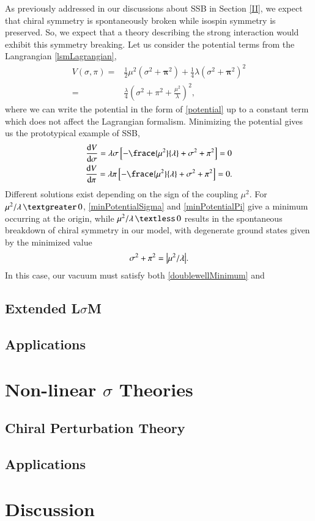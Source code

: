 \documentclass[aps,prd,onecolumn,showpacs,amsmath,amssymb,nofootinbib]{revtex4} \pdfoutput=1
\begin{document}
  As previously addressed in our discussions about SSB in Section \ref{II}, we expect that chiral symmetry is spontaneously broken while isospin symmetry is preserved. So, we expect that a theory describing the strong interaction would exhibit this symmetry breaking. Let us consider the potential terms from the Langrangian \eqref{lsmLagrangian},
  \begin{align}
      V(\sigma,\pi) = &\frac{1}{2}\mu^2\left(\sigma^2+\mathbf{\pi}^2\right) + \frac{1}{4}\lambda\left(\sigma^2+\mathbf{\pi}^2\right)^2\\
      = & \frac{\lambda}{4}\left(\sigma^2+\pi^2 + \frac{\mu^2}{\lambda} \right)^2,\label{potential}
  \end{align}
  where we can write the potential in the form of \eqref{potential} up to a constant term which does not affect the Lagrangian formalism. Minimizing the potential gives us the prototypical example of SSB,
  \begin{gather}
      \frac{\mathrm{d}V}{\mathrm{d}\mathbf{\sigma}} = \lambda \sigma \left[ -\frace{\mu^2}{\lambda} + \sigma^2 + \pi^2  \right]=0 \label{minPotentialSigma}\\
      \frac{\mathrm{d}V}{\mathrm{d}\mathbf{\pi}}= \lambda \pi \left[ -\frace{\mu^2}{\lambda} + \sigma^2 + \pi^2  \right]=0 \label{minPotentialPi}.
  \end{gather}
Different solutions exist depending on the sign of the coupling $\mu^2$. For $\mu^2/\lambda \, \textgreater\, 0$, \eqref{minPotentialSigma} and \eqref{minPotentialPi} give a minimum occurring at the origin, while $\mu^2/\lambda \, \textless\, 0$  results in the spontaneous breakdown of chiral symmetry in our model, with degenerate ground states given by the minimized value 
\begin{equation}
    \sigma^2 + \pi^2 = \abs{\mu^2/\lambda}.
    \label{doublewellMinimum}
\end{equation}
In this case, our vacuum must satisfy both \eqref{doublewellMinimum} and 
\subsection{Extended L$\sigma$M}
\subsection{Applications}
\section{Non-linear $\sigma$ Theories}\label{V}
\subsection{Chiral Perturbation Theory}
\subsection{Applications}

\section{Discussion}\label{VI}

\clearpage
%

\end{document}
